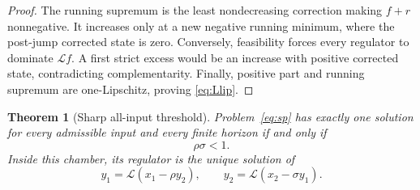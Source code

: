 \documentclass[10pt]{article}
\newtheorem{theorem}{Theorem}
\newcommand{\calL}{\mathcal L}
\begin{document}
\begin{proof}
The running supremum is the least nondecreasing correction making $f+r$
nonnegative.  It increases only at a new negative running minimum, where the
post-jump corrected state is zero.  Conversely, feasibility forces every
regulator to dominate $\calL f$.  A first strict excess would be an increase
with positive corrected state, contradicting complementarity.  Finally,
positive part and running supremum are one-Lipschitz, proving
\eqref{eq:Llip}.
\end{proof}

\begin{theorem}[Sharp all-input threshold]\label{thm:main}
Problem~\eqref{eq:sp} has exactly one solution for every admissible input and
every finite horizon if and only if
\begin{equation}\label{eq:chamber}
 \rho\sigma<1.
\end{equation}
Inside this chamber, its regulator is the unique solution of
\begin{equation}\label{eq:fixed}
 y_1=\calL(x_1-\rho y_2),\qquad
 y_2=\calL(x_2-\sigma y_1).
\end{equation}
\end{theorem}
\end{document}
